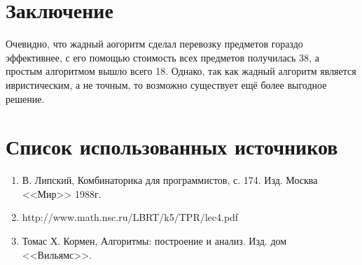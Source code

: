\documentclass[14pt,a4paper]{extarticle}
\begin{document}
\section{Заключение}

Очевидно, что жадный аогоритм сделал перевозку предметов гораздо эффективнее, с его помощью стоимость всех предметов получилась 38, а простым алгоритмом вышло всего 18. Однако, так как жадный алгоритм является ивристическим, а не точным, то возможно существует ещё более выгодное решение.


\section{Список использованных источников}
\begin{enumerate}
\item В. Липский, Комбинаторика для программистов, с. 174. Изд. Москва <<Мир>> 1988г.
\item http://www.math.nsc.ru/LBRT/k5/TPR/lec4.pdf
\item Томас Х. Кормен, Алгоритмы: построение и анализ. Изд. дом <<Вильямс>>.
\end{enumerate}
\end{document}

